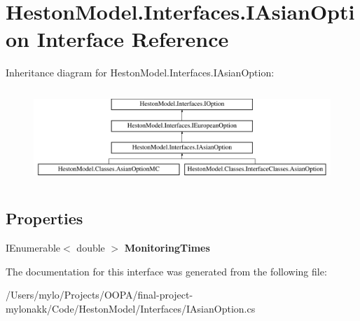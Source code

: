 \hypertarget{interface_heston_model_1_1_interfaces_1_1_i_asian_option}{}\section{Heston\+Model.\+Interfaces.\+I\+Asian\+Option Interface Reference}
\label{interface_heston_model_1_1_interfaces_1_1_i_asian_option}
Inheritance diagram for Heston\+Model.\+Interfaces.\+I\+Asian\+Option\+:\begin{figure}[H]
\begin{center}
\leavevmode
\includegraphics[height=3.578275cm]{interface_heston_model_1_1_interfaces_1_1_i_asian_option}
\end{center}
\end{figure}
\subsection*{Properties}
\begin{DoxyCompactItemize}
\item 
\mbox{\label{interface_heston_model_1_1_interfaces_1_1_i_asian_option_a341c696317fa7bb402cadfd489822af0}} 
I\+Enumerable$<$ double $>$ {\bfseries Monitoring\+Times}
\end{DoxyCompactItemize}


The documentation for this interface was generated from the following file\+:\begin{DoxyCompactItemize}
\item 
/\+Users/mylo/\+Projects/\+O\+O\+P\+A/final-\/project-\/mylonakk/\+Code/\+Heston\+Model/\+Interfaces/I\+Asian\+Option.\+cs\end{DoxyCompactItemize}
